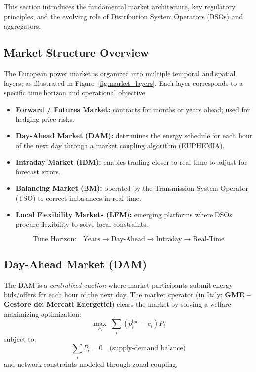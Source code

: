 \documentclass[11pt]{article}
\begin{document}
	This section introduces the fundamental market architecture, key regulatory principles, and the evolving role of Distribution System Operators (DSOs) and aggregators.
	
	\subsection{Market Structure Overview}
	
	The European power market is organized into multiple temporal and spatial layers, as illustrated in Figure~\ref{fig:market_layers}.  
	Each layer corresponds to a specific time horizon and operational objective.
	
	\begin{itemize}
		\item \textbf{Forward / Futures Market:} contracts for months or years ahead; used for hedging price risks.
		\item \textbf{Day-Ahead Market (DAM):} determines the energy schedule for each hour of the next day through a market coupling algorithm (EUPHEMIA).
		\item \textbf{Intraday Market (IDM):} enables trading closer to real time to adjust for forecast errors.
		\item \textbf{Balancing Market (BM):} operated by the Transmission System Operator (TSO) to correct imbalances in real time.
		\item \textbf{Local Flexibility Markets (LFM):} emerging platforms where DSOs procure flexibility to solve local constraints.
	\end{itemize}
	
	\begin{equation}
		\text{Time Horizon:} \quad \text{Years} \rightarrow \text{Day-Ahead} \rightarrow \text{Intraday} \rightarrow \text{Real-Time}
	\end{equation}
	
	\subsection{Day-Ahead Market (DAM)}
	
	The DAM is a \textit{centralized auction} where market participants submit energy bids/offers for each hour of the next day.  
	The market operator (in Italy: \textbf{GME – Gestore dei Mercati Energetici}) clears the market by solving a welfare-maximizing optimization:
	\[
	\max_{P_i} \; \sum_i (p_i^\text{bid} - c_i) P_i
	\]
	subject to:
	\[
	\sum_i P_i = 0 \quad \text{(supply-demand balance)}
	\]
	and network constraints modeled through zonal coupling.
	
\end{document}
